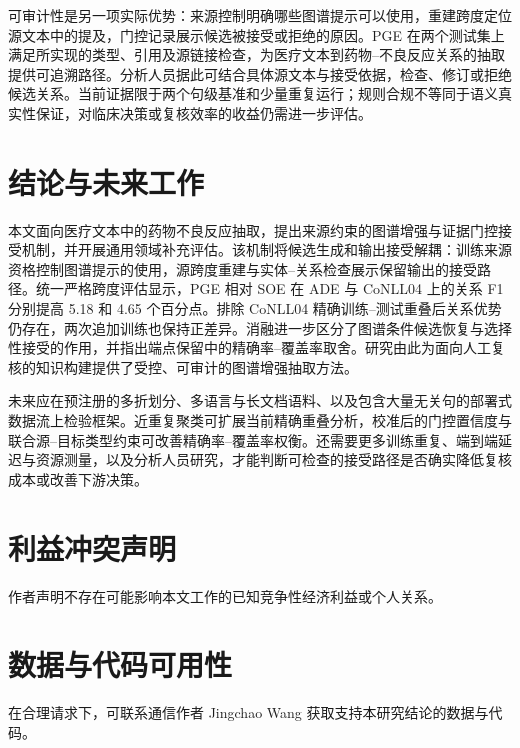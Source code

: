\documentclass[UTF8,a4paper,twocolumn,10pt]{ctexart}
\begin{document}
可审计性是另一项实际优势：来源控制明确哪些图谱提示可以使用，重建跨度定位源文本中的提及，门控记录展示候选被接受或拒绝的原因。PGE 在两个测试集上满足所实现的类型、引用及源链接检查，为医疗文本到药物--不良反应关系的抽取提供可追溯路径。分析人员据此可结合具体源文本与接受依据，检查、修订或拒绝候选关系。当前证据限于两个句级基准和少量重复运行；规则合规不等同于语义真实性保证，对临床决策或复核效率的收益仍需进一步评估。

\section{结论与未来工作}
本文面向医疗文本中的药物不良反应抽取，提出来源约束的图谱增强与证据门控接受机制，并开展通用领域补充评估。该机制将候选生成和输出接受解耦：训练来源资格控制图谱提示的使用，源跨度重建与实体--关系检查展示保留输出的接受路径。统一严格跨度评估显示，PGE 相对 SOE 在 ADE 与 CoNLL04 上的关系 F1 分别提高 5.18 和 4.65 个百分点。排除 CoNLL04 精确训练--测试重叠后关系优势仍存在，两次追加训练也保持正差异。消融进一步区分了图谱条件候选恢复与选择性接受的作用，并指出端点保留中的精确率--覆盖率取舍。研究由此为面向人工复核的知识构建提供了受控、可审计的图谱增强抽取方法。

未来应在预注册的多折划分、多语言与长文档语料、以及包含大量无关句的部署式数据流上检验框架。近重复聚类可扩展当前精确重叠分析，校准后的门控置信度与联合源--目标类型约束可改善精确率--覆盖率权衡。还需要更多训练重复、端到端延迟与资源测量，以及分析人员研究，才能判断可检查的接受路径是否确实降低复核成本或改善下游决策。

\section*{利益冲突声明}
作者声明不存在可能影响本文工作的已知竞争性经济利益或个人关系。

\section*{数据与代码可用性}
在合理请求下，可联系通信作者 Jingchao Wang 获取支持本研究结论的数据与代码。



\end{document}
